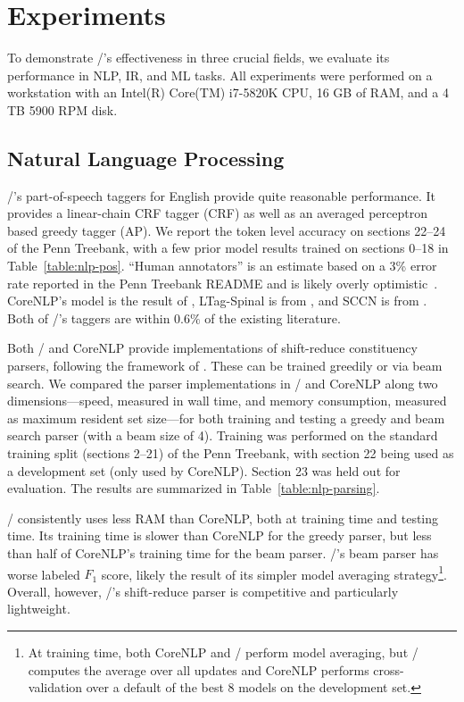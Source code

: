 \section{Experiments}
\label{sec:experiments}

To demonstrate \meta/'s effectiveness in three crucial fields, we evaluate its
performance in NLP, IR, and ML tasks. All experiments were performed on a
workstation with an Intel(R) Core(TM) i7-5820K CPU, 16 GB of RAM, and a 4
TB 5900 RPM disk.

\subsection{Natural Language Processing}



\meta/'s part-of-speech taggers for English provide quite reasonable
performance. It provides a linear-chain CRF tagger (CRF) as well as an
averaged perceptron based greedy tagger (AP). We report the token level
accuracy on sections 22--24 of the Penn Treebank, with a few prior model
results trained on sections 0--18 in Table~\ref{table:nlp-pos}. ``Human
annotators'' is an estimate based on a 3\% error rate reported in the Penn
Treebank README and is likely overly
optimistic~\cite{Manning:2011:CICLing}. CoreNLP's model is the result of
, LTag-Spinal is from
, and SCCN is from .
Both of \meta/'s taggers are within $0.6\%$ of the existing literature.



Both \meta/ and CoreNLP provide implementations of shift-reduce
constituency parsers, following the framework of .
These can be trained greedily or via beam search. We compared the parser
implementations in \meta/ and CoreNLP along two dimensions---speed,
measured in wall time, and memory consumption, measured as maximum resident
set size---for both training and testing a greedy and beam search parser
(with a beam size of 4). Training was performed on the standard training
split (sections 2--21) of the Penn Treebank, with section 22 being used as
a development set (only used by CoreNLP). Section 23 was held out for
evaluation. The results are summarized in Table~\ref{table:nlp-parsing}.

\meta/ consistently uses less RAM than CoreNLP, both at training
time and testing time. Its training time is slower than CoreNLP
for the greedy parser, but less than half of CoreNLP's training time for
the beam parser. \meta/'s beam parser has worse labeled $F_1$ score, likely
the result of its simpler model averaging strategy\footnote{At training
time, both CoreNLP and \meta/ perform model averaging, but \meta/
computes the average over all updates and CoreNLP performs
cross-validation over a default of the best 8 models on the development
set.}. Overall, however, \meta/'s shift-reduce parser is competitive and
particularly lightweight.

